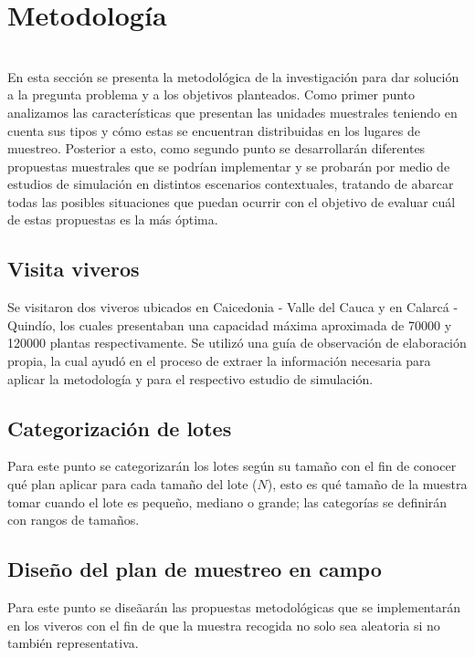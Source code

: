 \chapter{Metodolog\'{i}a}
~\\En esta secci\'{o}n se presenta la metodol\'{o}gica de la investigaci\'{o}n para dar soluci\'{o}n a la pregunta problema y a los objetivos planteados. Como primer punto analizamos las caracter\'{i}sticas que presentan las unidades muestrales teniendo en cuenta sus tipos y c\'{o}mo estas se encuentran distribuidas en los lugares de muestreo. Posterior a esto, como segundo punto se desarrollar\'{a}n diferentes propuestas muestrales que se podr\'{i}an implementar y se probar\'{a}n por medio de estudios de simulaci\'{o}n en distintos escenarios contextuales, tratando de abarcar todas las posibles situaciones que puedan ocurrir con el objetivo de evaluar cu\'{a}l de estas propuestas es la m\'{a}s \'{o}ptima. 

\section{Visita viveros}
Se visitaron dos viveros ubicados en Caicedonia - Valle del Cauca y en Calarc\'{a} - Quind\'{i}o, los cuales presentaban una capacidad m\'{a}xima aproximada de 70000 y 120000 plantas respectivamente. Se utiliz\'{o} una gu\'{i}a de observaci\'{o}n de elaboraci\'{o}n propia, la cual ayud\'{o} en el proceso de extraer la informaci\'{o}n necesaria para aplicar la metodolog\'{i}a y para el respectivo estudio de simulaci\'{o}n.

\section{Categorizaci\'{o}n de lotes} 

Para este punto se categorizar\'{a}n los lotes seg\'{u}n su tama\~{n}o con el fin de conocer qu\'{e} plan aplicar para cada tama\~{n}o del lote ($N$), esto es qu\'{e} tama\~{n}o de la muestra tomar cuando el lote es peque\~{n}o, mediano o grande; las categor\'{i}as se definir\'{a}n con rangos de tama\~{n}os.

\section{Dise\~{n}o del plan de muestreo en campo}

Para este punto se dise\~{a}ar\'{a}n las propuestas metodol\'{o}gicas que se implementar\'{a}n en los viveros con el fin de que la muestra recogida no solo sea aleatoria si no tambi\'{e}n representativa.

